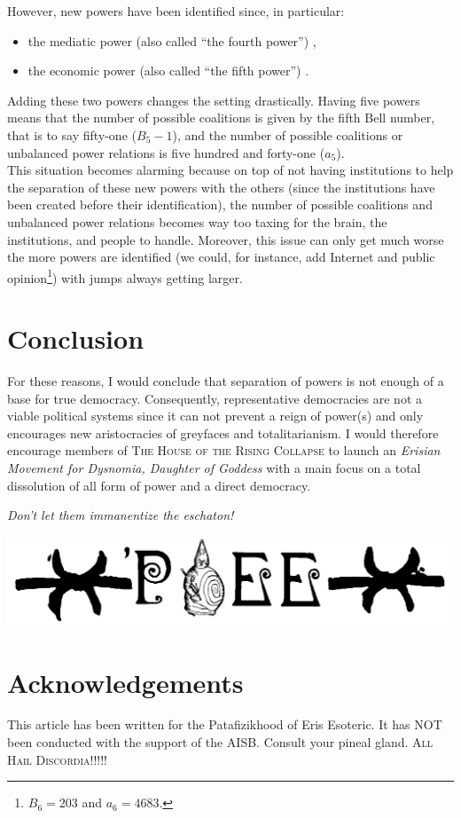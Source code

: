 However, new powers have been identified since, in particular:
\begin{itemize}
\item the mediatic power (also called ``the fourth power'') \cite{Bourdieu1996, Herman1988},
\item the economic power (also called ``the fifth power'') \cite{Ramonet1989, Ramonet1996}.
\end{itemize}
Adding these two powers changes the setting drastically. Having five powers means that the number of possible coalitions is given by the fifth Bell number, that is to say fifty-one ($B_5 -1$), and the number of possible coalitions or unbalanced power relations is five hundred and forty-one ($a_5$).\\
This situation becomes alarming because on top of not having institutions to help the separation of these new powers with the others (since the institutions have been created before their identification), the number of possible coalitions and unbalanced power relations becomes way too taxing for the brain, the institutions, and people to handle. Moreover, this issue can only get much worse the more powers are identified (we could, for instance, add Internet and public opinion\footnote{$B_6 = 203$ and $a_6 = 4683$.}) with jumps always getting larger.\\

\section*{Conclusion}

For these reasons, I would conclude that separation of powers is not enough of a base for true democracy. Consequently, representative democracies are not a viable political systems since it can not prevent a reign of power(s) and only encourages new aristocracies of greyfaces and totalitarianism. 
I would therefore encourage members of \textsc{The House of the Rising Collapse} to launch an \textit{Erisian Movement for Dysnomia, Daughter of Goddess} with a main focus on a total dissolution of all form of power and a direct democracy.

\begin{center}
\textit{Don't let them immanentize the eschaton!\\}

\includegraphics[scale=0.3]{./img/poee.png}
\end{center}

\section*{Acknowledgements}
This article has been written for the Patafizikhood of Eris Esoteric. It has NOT been conducted with the support of the AISB. Consult your pineal gland. \textsc{All Hail Discordia!!!!!}


